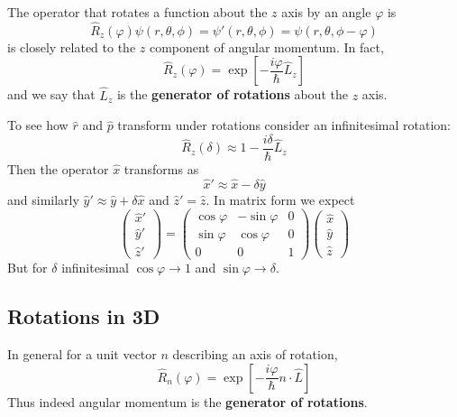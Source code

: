 \documentclass[12pt, a4paper, oneside, openright, titlepage]{book}
\begin{document}
The operator that rotates a function about the $z$ axis by an angle $\varphi$ is \begin{equation*}
    \hat{R}_z(\varphi)\psi(r,\theta,\phi) = \psi'(r,\theta,\phi) = \psi(r,\theta,\phi-\varphi)
\end{equation*}
is closely related to the $z$ component of angular momentum. In fact, \begin{equation*}
    \hat{R}_z(\varphi) = \exp\left[-\frac{i\varphi}{\hbar}\hat{L}_z\right]
\end{equation*}
and we say that $\hat{L}_z$ is the \textbf{generator of rotations} about the $z$ axis. 

To see how $\hat{r}$ and $\hat{p}$ transform under rotations consider an infinitesimal rotation: \begin{equation*}
    \hat{R}_z(\delta) \approx 1 - \frac{i\delta}{\hbar}\hat{L}_z
\end{equation*}
Then the operator $\hat{x}$ transforms as \begin{equation*}
    \hat{x}' \approx \hat{x}-\delta\hat{y}
\end{equation*}
and similarly $\hat{y}'\approx \hat{y}+\delta\hat{x}$ and $\hat{z}' = \hat{z}$. In matrix form we expect \begin{equation*}
    \begin{pmatrix} \hat{x}' \\ \hat{y}' \\ \hat{z}' \end{pmatrix} = \begin{pmatrix} \cos\varphi & -\sin\varphi & 0 \\ \sin\varphi & \cos\varphi & 0 \\ 0 & 0& 1 \end{pmatrix}\begin{pmatrix} \hat{x} \\ \hat{y} \\ \hat{z}\end{pmatrix}
\end{equation*}
But for $\delta$ infinitesimal $\cos\varphi\rightarrow 1$ and $\sin\varphi \rightarrow \delta$.


\subsection{Rotations in 3D}

In general for a unit vector $n$ describing an axis of rotation, \begin{equation*}
    \hat{R}_n(\varphi) = \exp\left[-\frac{i\varphi}{\hbar}n\cdot\hat{L}\right]
\end{equation*}
Thus indeed angular momentum is the \textbf{generator of rotations}.
\end{document}
